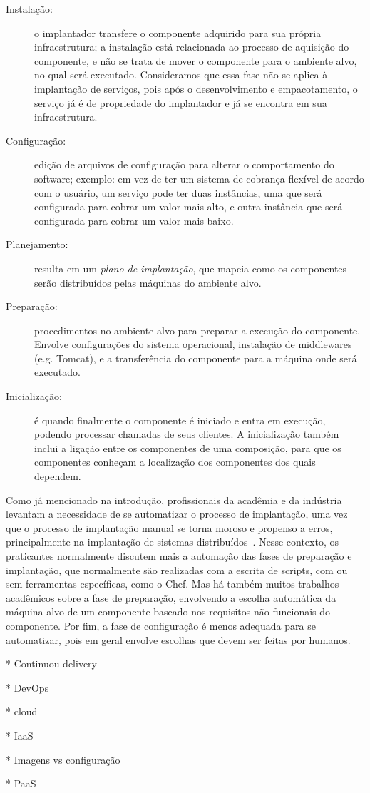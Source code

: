 \begin{description}
\item [Instalação:] o implantador transfere o componente adquirido para sua própria infraestrutura; a instalação está relacionada ao processo de aquisição do componente, e não se trata de mover o componente para o ambiente alvo, no qual será executado. Consideramos que essa fase não se aplica à implantação de serviços, pois após o desenvolvimento e empacotamento, o serviço já é de propriedade do implantador e já se encontra em sua infraestrutura.
\item [Configuração:] edição de arquivos de configuração para alterar o comportamento do software; exemplo: em vez de ter um sistema de cobrança flexível de acordo com o usuário, um serviço pode ter duas instâncias, uma que será configurada para cobrar um valor mais alto, e outra instância que será configurada para cobrar um valor mais baixo. 
\item [Planejamento:] resulta em um \emph{plano de implantação}, que mapeia como os componentes serão distribuídos pelas máquinas do ambiente alvo.  
\item [Preparação:] procedimentos no ambiente alvo para preparar a execução do componente. Envolve configurações do sistema operacional, instalação de middlewares (e.g. Tomcat), e a transferência do componente para a máquina onde será executado. 
\item [Inicialização:] é quando finalmente o componente é iniciado e entra em execução, podendo processar chamadas de seus clientes. A inicialização também inclui a ligação entre os componentes de uma composição, para que os componentes conheçam a localização dos componentes dos quais dependem.
\end{description}

Como já mencionado na introdução, profissionais da acadêmia e da indústria levantam a necessidade de se automatizar o processo de implantação, uma vez que o processo de implantação manual se torna moroso e propenso a erros, principalmente na implantação de sistemas distribuídos~\cite{Humble2011Continuous,Dolstra2005Configuration}. Nesse contexto, os praticantes normalmente discutem mais a automação das fases de preparação e implantação, que normalmente são realizadas com a escrita de scripts, com ou sem ferramentas específicas, como o Chef. Mas há também muitos trabalhos acadêmicos sobre a fase de preparação, envolvendo a escolha automática da máquina alvo de um componente baseado nos requisitos não-funcionais do componente. Por fim, a fase de configuração é menos adequada para se automatizar, pois em geral envolve escolhas que devem ser feitas por humanos.

* Continuou delivery

* DevOps

* cloud 

* IaaS

* Imagens vs configuração

* PaaS



